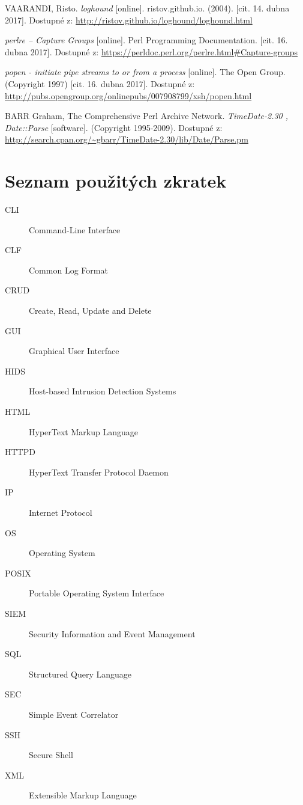 \documentclass[thesis=B,czech]{FITthesis}[2012/06/26]
\begin{document}
\begin{thebibliography}{9}
	VAARANDI, Risto. \textit{loghound} [online]. ristov.github.io. (2004). [cit. 14. dubna 2017]. Dostupné z: \url{http://ristov.github.io/loghound/loghound.html}
	
	\textit{perlre -- Capture Groups} [online]. Perl Programming Documentation. [cit. 16. dubna 2017]. Dostupné z: \url{https://perldoc.perl.org/perlre.html#Capture-groups}
	
	\textit{popen - initiate pipe streams to or from a process} [online]. The Open Group. (Copyright 1997) [cit. 16. dubna 2017]. Dostupné z: \url{http://pubs.opengroup.org/onlinepubs/007908799/xsh/popen.html}
	
	BARR Graham, The Comprehensive Perl Archive Network. \textit{TimeDate-2.30 , Date::Parse} [software]. (Copyright 1995-2009). Dostupné z: \url{http://search.cpan.org/~gbarr/TimeDate-2.30/lib/Date/Parse.pm}
		
\end{thebibliography}
%

\appendix

\chapter{Seznam použitých zkratek}

\begin{description}
	\item[CLI] Command-Line Interface
	\item[CLF] Common Log Format
	\item[CRUD] Create, Read, Update and Delete
	\item[GUI] Graphical User Interface
	\item[HIDS] Host-based Intrusion Detection Systems	
	\item[HTML] HyperText Markup Language
	\item[HTTPD] HyperText Transfer Protocol Daemon 
	\item[IP] Internet Protocol
	\item[OS] Operating System
	\item[POSIX] Portable Operating System Interface
	\item[SIEM] Security Information and Event Management
	\item[SQL] Structured Query Language
	\item[SEC] Simple Event Correlator
	\item[SSH] Secure Shell
	\item[XML] Extensible Markup Language
	
\end{description}
\end{document}
